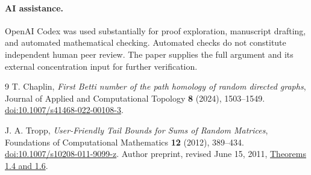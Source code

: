 \documentclass[11pt]{article}
\theoremstyle{remark}
\begin{document}
\paragraph{AI assistance.}
OpenAI Codex was used substantially for proof exploration, manuscript
drafting, and automated mathematical checking. Automated checks do not
constitute independent human peer review. The paper supplies the full
argument and its external concentration input for further verification.

\begin{thebibliography}{9}
T. Chaplin,
\emph{First Betti number of the path homology of random directed graphs},
Journal of Applied and Computational Topology \textbf{8} (2024), 1503--1549.
\href{https://doi.org/10.1007/s41468-022-00108-3}{doi:10.1007/s41468-022-00108-3}.

J. A. Tropp,
\emph{User-Friendly Tail Bounds for Sums of Random Matrices},
Foundations of Computational Mathematics \textbf{12} (2012), 389--434.
\href{https://doi.org/10.1007/s10208-011-9099-z}{doi:10.1007/s10208-011-9099-z}.
Author preprint, revised June 15, 2011,
\href{https://tropp.caltech.edu/papers/Tro11-User-Friendly-preprint.pdf}{Theorems 1.4 and 1.6}.
\end{thebibliography}
\end{document}
